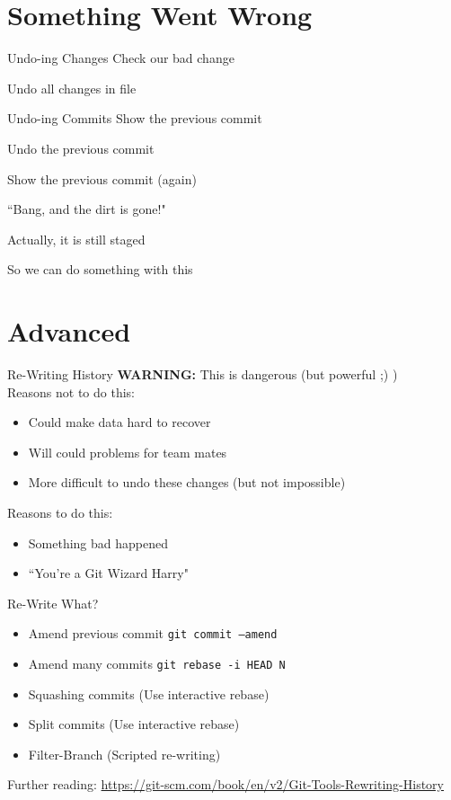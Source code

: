 \documentclass{beamer}
\begin{document}
  \section{Something Went Wrong}
  \begin{frame}[fragile=singleslide]{Undo-ing Changes}
    Check our bad change
    
    Undo all changes in file
    
  \end{frame}
  \begin{frame}[fragile=singleslide]{Undo-ing Commits}
    Show the previous commit
    
    Undo the previous commit
    
  \end{frame}
  \begin{frame}[fragile=singleslide]
    Show the previous commit (again)
    
    ``Bang, and the dirt is gone!"
  \end{frame}
  \begin{frame}[fragile=singleslide]
    Actually, it is still staged
    
    So we can do something with this
  \end{frame}
  \section{Advanced}
  \begin{frame}{Re-Writing History}
    \textbf{WARNING:} This is dangerous (but powerful ;) )
    \\
    Reasons not to do this:
    \begin{itemize}
      \item Could make data hard to recover
      \item Will could problems for team mates
      \item More difficult to undo these changes (but not impossible)
    \end{itemize}
    Reasons to do this:
    \begin{itemize}
      \item Something bad happened
      \item ``You're a Git Wizard Harry"
    \end{itemize}
  \end{frame}
  \begin{frame}{Re-Write What?}
    \begin{itemize}
      \item Amend previous commit \texttt{git commit --amend}
      \item Amend many commits \texttt{git rebase -i HEAD~N}
      \item Squashing commits (Use interactive rebase)
      \item Split commits (Use interactive rebase)
      \item Filter-Branch (Scripted re-writing)
    \end{itemize}
    Further reading:
    \url{https://git-scm.com/book/en/v2/Git-Tools-Rewriting-History}
  \end{frame}
\end{document}
